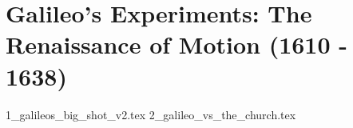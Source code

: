 \section{Galileo’s Experiments: The Renaissance of Motion (1610 - 1638)}

{1_galileos_big_shot_v2.tex}
{2_galileo_vs_the_church.tex}